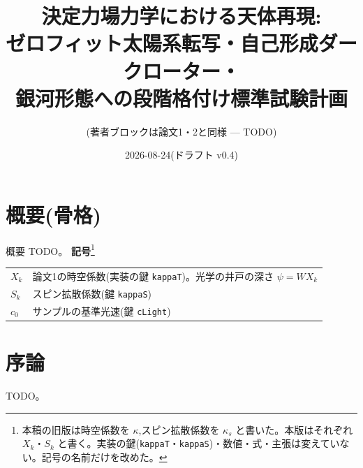 \documentclass[a4paper,10pt,twocolumn]{ltjsarticle}
\title{決定力場力学における天体再現:\\
ゼロフィット太陽系転写・自己形成ダークローター・\\
銀河形態への段階格付け標準試験計画}
\author{(著者ブロックは論文1・2と同様 — TODO)}
\date{2026-08-24(ドラフト v0.4)}
\begin{document}
\maketitle

\section*{概要(骨格)}
概要 TODO。
\noindent\textbf{記号}\footnote{本稿の旧版は時空係数を $\kappa$,スピン拡散係数を $\kappa_s$ と書いた。本版はそれぞれ $X_k$・$S_k$ と書く。実装の鍵(\texttt{kappaT}・\texttt{kappaS})・数値・式・主張は変えていない。記号の名前だけを改めた。}
\begin{center}
\small
\begin{tabular}{@{}lp{}@{}}
\hline
$X_k$ & 論文1の時空係数(実装の鍵 \texttt{kappaT})。光学の井戸の深さ $\psi = W X_k$ \\
$S_k$ & スピン拡散係数(鍵 \texttt{kappaS}) \\
$c_0$ & サンプルの基準光速(鍵 \texttt{cLight}) \\
\hline
\end{tabular}
\end{center}


\section{序論}
TODO。
\end{document}
